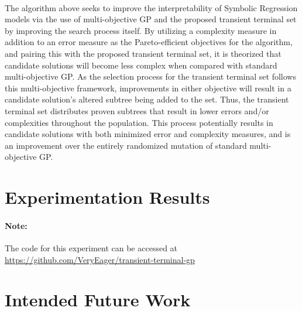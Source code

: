 \documentclass[a4paper]{article}
\begin{document}
\paragraph{} The algorithm above seeks to improve the interpretability of Symbolic Regression models via the use of multi-objective GP and the proposed transient terminal set by improving the search process itself. By utilizing a complexity measure in addition to an error measure as the Pareto-efficient objectives for the algorithm, and pairing this with the proposed transient terminal set, it is theorized that candidate solutions will become less complex when compared with standard multi-objective GP. As the selection process for the transient terminal set follows this multi-objective framework, improvements in either objective will result in a candidate solution's altered subtree being added to the set. Thus, the transient terminal set distributes proven subtrees that result in lower errors and/or complexities throughout the population. This process potentially results in candidate solutions with both minimized error and complexity measures, and is an improvement over the entirely randomized mutation of standard multi-objective GP.

\section{Experimentation Results}
\paragraph{Note:} The code for this experiment can be accessed at \url{https://github.com/VeryEager/transient-terminal-gp}

\section{Intended Future Work}
\end{document}
